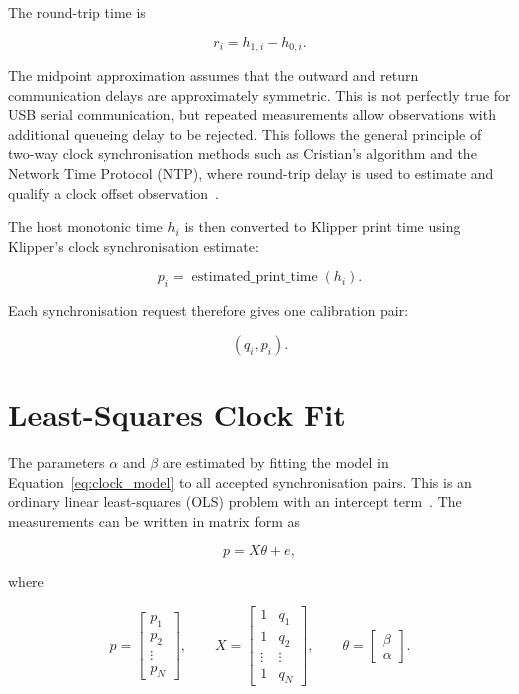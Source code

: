\documentclass[11pt,a4paper]{article}
\begin{document}
The round-trip time is

\begin{equation}
    r_i = h_{1,i} - h_{0,i}.
\end{equation}

The midpoint approximation assumes that the outward and return communication
delays are approximately symmetric. This is not perfectly true for USB serial
communication, but repeated measurements allow observations with additional
queueing delay to be rejected. This follows the general principle of two-way
clock synchronisation methods such as Cristian's algorithm and the Network Time
Protocol (NTP), where round-trip delay is used to estimate and qualify a clock
offset observation~\cite{cristian1989probabilistic,mills2010ntp}.

The host monotonic time \(h_i\) is then converted to Klipper print time using
Klipper's clock synchronisation estimate:

\begin{equation}
    p_i = \operatorname{estimated\_print\_time}(h_i).
\end{equation}

Each synchronisation request therefore gives one calibration pair:

\begin{equation}
    (q_i, p_i).
\end{equation}

\section{Least-Squares Clock Fit}

The parameters \(\alpha\) and \(\beta\) are estimated by fitting the model in
Equation~\eqref{eq:clock_model} to all accepted synchronisation pairs. This is
an ordinary linear least-squares (OLS) problem with an intercept
term~\cite{montgomery2012linear}. The measurements can be written in matrix form as

\begin{equation}
    p = X\theta + e,
\end{equation}

where

\begin{equation}
    p =
    \begin{bmatrix}
        p_1 \\
        p_2 \\
        \vdots \\
        p_N
    \end{bmatrix},
    \qquad
    X =
    \begin{bmatrix}
        1 & q_1 \\
        1 & q_2 \\
        \vdots & \vdots \\
        1 & q_N
    \end{bmatrix},
    \qquad
    \theta =
    \begin{bmatrix}
        \beta \\
        \alpha
    \end{bmatrix}.
\end{equation}
\end{document}
